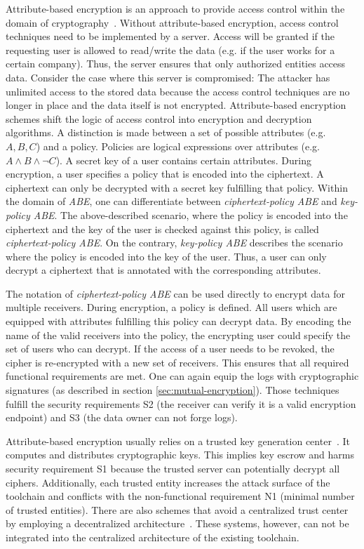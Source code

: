 \documentclass[../main.tex]{subfiles}
\begin{document}
Attribute-based encryption is an approach to provide access control within the domain of cryptography~\cite{Bethencourt2007}. 
Without attribute-based encryption, access control techniques need to be implemented by a server. 
Access will be granted if the requesting user is allowed to read/write the data (e.g. if the user works for a certain company). 
Thus, the server ensures that only authorized entities access data. 
Consider the case where this server is compromised: 
The attacker has unlimited access to the stored data because the access control techniques are no longer in place and the data itself is not encrypted.
Attribute-based encryption schemes shift the logic of access control into encryption and decryption algorithms. 
A distinction is made between a set of possible attributes (e.g. ${A,B,C}$) and a policy. 
Policies are logical expressions over attributes (e.g. $A \land B \land \neg C$). 
A secret key of a user contains certain attributes. 
During encryption, a user specifies a policy that is encoded into the ciphertext.
A ciphertext can only be decrypted with a secret key fulfilling that policy.
Within the domain of \textit{ABE}, one can differentiate between \textit{ciphertext-policy ABE} and \textit{key-policy ABE}. 
The above-described scenario, where the policy is encoded into the ciphertext and the key of the user is checked against this policy, is called \textit{ciphertext-policy ABE}. 
On the contrary, \textit{key-policy ABE} describes the scenario where the policy is encoded into the key of the user.
Thus, a user can only decrypt a ciphertext that is annotated with the corresponding attributes.~\cite{Bethencourt2007}

The notation of \textit{ciphertext-policy ABE} can be used directly to encrypt data for multiple receivers. 
During encryption, a policy is defined. 
All users which are equipped with attributes fulfilling this policy can decrypt data.
By encoding the name of the valid receivers into the policy, the encrypting user could specify the set of users who can decrypt.
If the access of a user needs to be revoked, the cipher is re-encrypted with a new set of receivers.
This ensures that all required functional requirements are met.
One can again equip the logs with cryptographic signatures (as described in section \ref{sec:mutual-encryption}).
Those techniques fulfill the security requirements S2 (the receiver can verify it is a valid encryption endpoint) and S3 (the data owner can not forge logs).

Attribute-based encryption usually relies on a trusted key generation center~\cite{Sahai2009}.
It computes and distributes cryptographic keys.
This implies key escrow and harms security requirement S1 because the trusted server can potentially decrypt all ciphers.
Additionally, each trusted entity increases the attack surface of the toolchain and conflicts with the non-functional requirement N1 (minimal number of trusted entities).
There are also schemes that avoid a centralized trust center by employing a decentralized architecture~\cite{Vaanchig2018}.
These systems, however, can not be integrated into the centralized architecture of the existing toolchain.
\end{document}
